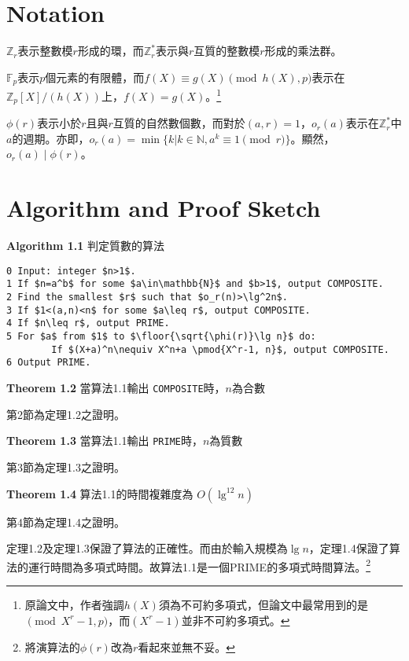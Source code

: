 \documentclass{article}
\DeclarePairedDelimiter\floor{\lfloor}{\rfloor}
\newcommand{\nequiv}{\not\equiv}
\begin{document}
\section{Notation}

    $\mathbb{Z}_r$表示整數模$r$形成的環，而$\mathbb{Z}_r^*$表示與$r$互質的整數模$r$形成的乘法群。

    $\mathbb{F}_p$表示$p$個元素的有限體，而$f(X)\equiv g(X)\pmod{h(X), p}$表示在$\mathbb{Z}_p[X]/(h(X))$上，$f(X)=g(X)$。\footnote{原論文中，作者強調$h(X)$須為不可約多項式，但論文中最常用到的是$\pmod{X^r-1, p}$，而$(X^r-1)$並非不可約多項式。}

    $\phi(r)$表示小於$r$且與$r$互質的自然數個數，而對於$(a,r)=1$，$o_r(a)$表示在$\mathbb{Z}_r^*$中$a$的週期。亦即，$o_r(a)=\min\{k|k\in\mathbb{N}, a^k\equiv 1\pmod{r}\}$。顯然，$o_r(a)\mid\phi(r)$。

\section{Algorithm and Proof Sketch}
\begin{mdframed}
\noindent\textbf{Algorithm 1.1} 判定質數的算法
\begin{lstlisting}[mathescape=true]
0 Input: integer $n>1$.
1 If $n=a^b$ for some $a\in\mathbb{N}$ and $b>1$, output COMPOSITE.
2 Find the smallest $r$ such that $o_r(n)>\lg^2n$.
3 If $1<(a,n)<n$ for some $a\leq r$, output COMPOSITE.
4 If $n\leq r$, output PRIME.
5 For $a$ from $1$ to $\floor{\sqrt{\phi(r)}\lg n}$ do:
        If $(X+a)^n\nequiv X^n+a \pmod{X^r-1, n}$, output COMPOSITE.
6 Output PRIME.
\end{lstlisting}
\end{mdframed}

\begin{mdframed}
\noindent\textbf{Theorem 1.2} 當算法1.1輸出 \texttt{COMPOSITE}時，$n$為合數
\end{mdframed}
第2節為定理1.2之證明。

\begin{mdframed}
\noindent\textbf{Theorem 1.3} 當算法1.1輸出 \texttt{PRIME}時，$n$為質數
\end{mdframed}
第3節為定理1.3之證明。

\begin{mdframed}
\noindent\textbf{Theorem 1.4} 算法1.1的時間複雜度為 \(O(\lg^{12}n)\)
\end{mdframed}
    第4節為定理1.4之證明。

    定理1.2及定理1.3保證了算法的正確性。而由於輸入規模為$\lg n$，定理1.4保證了算法的運行時間為多項式時間。故算法1.1是一個PRIME的多項式時間算法。\footnote{將演算法的$\phi(r)$改為$r$看起來並無不妥。}
\end{document}
